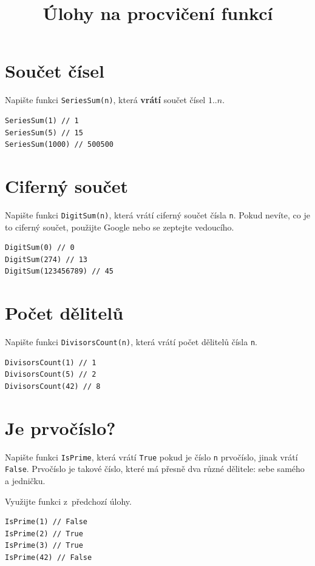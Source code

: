 \documentclass[12pt,a4paper]{article}
\begin{document}
\pagestyle{empty}
\title{Úlohy na procvičení funkcí}
\date{\vspace{-10ex}}
\setlength{\droptitle}{-6em}
\maketitle

\setlength\parindent{0pt}

\begin{multicols}{2}

\section{Součet čísel}

Napište funkci \texttt{SeriesSum(n)}, která \textbf{vrátí} součet čísel
$1..n$.

\begin{verbatim}
SeriesSum(1) // 1
SeriesSum(5) // 15
SeriesSum(1000) // 500500
\end{verbatim}

\section{Ciferný součet}

Napište funkci \texttt{DigitSum(n)}, která vrátí ciferný součet čísla
\texttt{n}. Pokud nevíte, co je to ciferný součet, použijte Google nebo se
zeptejte vedoucího.

\begin{verbatim}
DigitSum(0) // 0
DigitSum(274) // 13
DigitSum(123456789) // 45
\end{verbatim}

\section{Počet dělitelů}

Napište funkci \texttt{DivisorsCount(n)}, která vrátí počet dělitelů čísla
\texttt{n}.

\begin{verbatim}
DivisorsCount(1) // 1
DivisorsCount(5) // 2
DivisorsCount(42) // 8
\end{verbatim}

\section{Je prvočíslo?}

Napište funkci \texttt{IsPrime}, která vrátí \texttt{True} pokud je číslo
\texttt{n} prvočíslo, jinak vrátí \texttt{False}. Prvočíslo je takové číslo,
které má přesně dva různé dělitele: sebe samého a jedničku.

Využijte funkci z~předchozí úlohy.

\begin{verbatim}
IsPrime(1) // False
IsPrime(2) // True
IsPrime(3) // True
IsPrime(42) // False
\end{verbatim}

\end{multicols}
\end{document}
